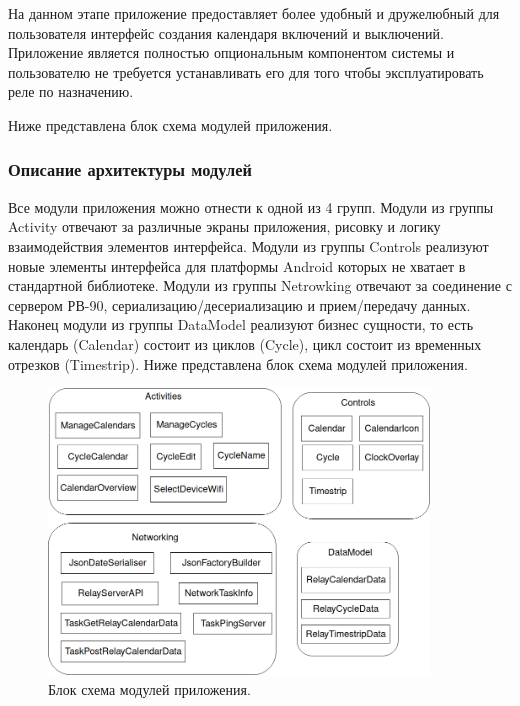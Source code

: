 На данном этапе приложение предоставляет более удобный и дружелюбный для пользователя интерфейс создания календаря включений и выключений. Приложение является полностью опциональным компонентом системы и пользователю не требуется устанавливать его для того чтобы эксплуатировать реле по назначению.

Ниже представлена блок схема модулей приложения.



\subsubsection{ Описание архитектуры модулей}
Все модули приложения можно отнести к одной из 4 групп. Модули из группы Activity отвечают за различные экраны приложения, рисовку и логику взаимодействия элементов интерфейса. Модули из группы Controls реализуют новые элементы интерфейса для платформы Android которых не хватает в стандартной библиотеке. Модули из группы Netrowking отвечают за соединение с сервером РВ-90, сериализацию/десериализацию и прием/передачу данных. Наконец модули из группы DataModel реализуют бизнес сущности, то есть календарь (Calendar) состоит из циклов (Cycle), цикл состоит из временных отрезков (Timestrip). 
Ниже представлена блок схема модулей приложения.

\begin{figure}[h!]
    \centering
    \includegraphics[width=0.9\textwidth]{mobile_module_blocks.png}
    \caption{Блок схема модулей приложения.}
\end{figure}

